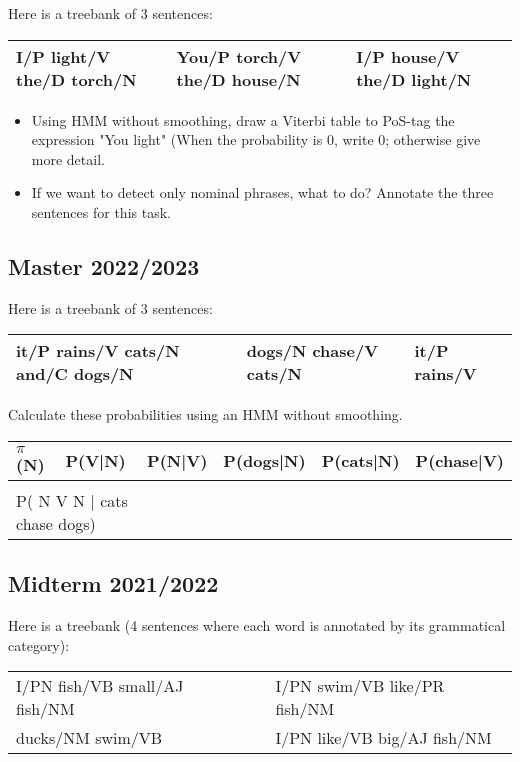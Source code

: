 \documentclass[11pt, a4paper]{article}
\begin{document}
Here is a treebank of 3 sentences:
\begin{center}
	\begin{tabular}{|lll|}
		\hline
		I/P light/V the/D torch/N &
		You/P torch/V the/D house/N &
		I/P house/V the/D light/N \\
		\hline
	\end{tabular}
\end{center}

\begin{itemize}
	\item Using HMM without smoothing, draw a Viterbi table to PoS-tag the expression "You light" (When the probability is 0, write 0; otherwise give more detail.
	\item If we want to detect only nominal phrases, what to do? Annotate the three sentences for this task. 
\end{itemize}


\subsection{Master 2022/2023}

Here is a treebank of 3 sentences:
\begin{center}
	\begin{tabular}{|lll|}
		\hline
		it/P rains/V cats/N and/C dogs/N &
		dogs/N chase/V cats/N &
		it/P rains/V \\
		\hline
	\end{tabular}
\end{center}

Calculate these probabilities using an HMM without smoothing.
\begin{center}
	\begin{tabular}{|l|l|l|l|l|l|}
	\hline
	$ \pi $(N) & P(V|N) & P(N|V) & P(dogs|N) & P(cats|N) & P(chase|V) \\
	\hline
	&&&&&\\
	\hline
	\multicolumn{2}{|l|}{P( N V N | cats chase dogs)} & \multicolumn{4}{|l|}{} \\
	\hline
\end{tabular}
\end{center}

\subsection{Midterm 2021/2022}

Here is a treebank (4 sentences where each word is annotated by its grammatical category):
\begin{center}
	\begin{tabular}{|lll|}
		\hline
		I/PN fish/VB small/AJ fish/NM &&
		I/PN swim/VB like/PR fish/NM \\
		ducks/NM swim/VB &&
		I/PN like/VB big/AJ fish/NM \\
		\hline
	\end{tabular}
\end{center}
\end{document}
